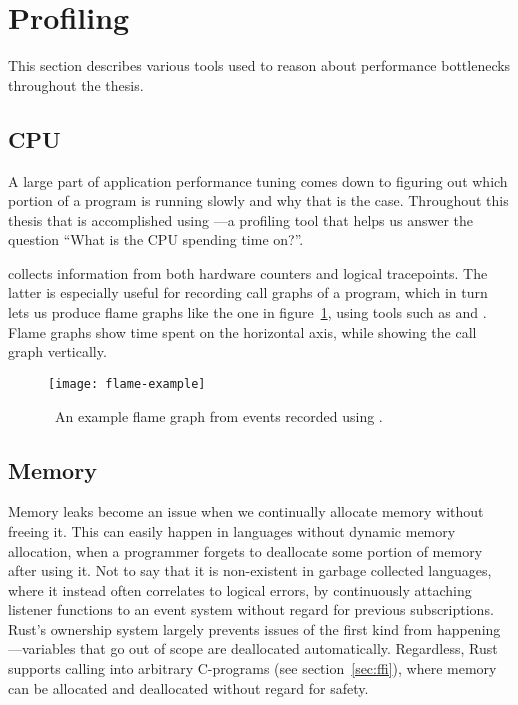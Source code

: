 \section{Profiling}

This section describes various tools used to reason about performance
bottlenecks throughout the thesis.

\subsection{CPU}

A large part of application performance tuning comes down to figuring out which
portion of a program is running slowly and why that is the case. Throughout
this thesis that is accomplished using
---a profiling tool that helps us
answer the question ``What is the CPU spending time on?''.

 collects information from both hardware counters and logical
tracepoints. The latter is especially useful for recording call graphs of a
program, which in turn lets us produce flame graphs like the one in
figure~\ref{fig:flame-example}, using tools such as
 and
. Flame graphs show
time spent on the horizontal axis, while showing the call graph vertically.

\begin{figure}[H]
  \centering
  \texttt{[image: flame-example]}
  \caption{\
    An example flame graph from events recorded using .
  }\label{fig:flame-example}
\end{figure}

\subsection{Memory}

Memory leaks become an issue when we continually allocate memory without freeing
it. This can easily happen in languages without dynamic memory allocation, when
a programmer forgets to deallocate some portion of memory after using it. Not to
say that it is non-existent in garbage collected languages, where it instead
often correlates to logical errors, \eg by continuously attaching listener
functions to an event system without regard for previous subscriptions. Rust's
ownership system largely prevents issues of the first kind from
happening---variables that go out of scope are deallocated automatically.
Regardless, Rust supports calling into arbitrary C-programs (see
section~\ref{sec:ffi}), where memory can be allocated and deallocated without
regard for safety.

